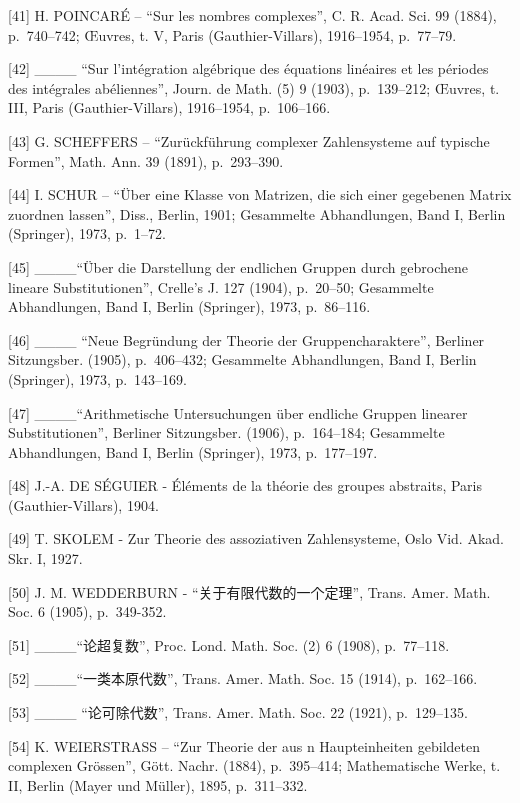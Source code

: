 {[}41{]} H. POINCARÉ -- ``Sur les nombres complexes'', C. R. Acad. Sci. 99 (1884), p.~740--742; Œuvres, t. V, Paris (Gauthier-Villars), 1916--1954, p.~77--79.

{[}42{]} \_\_\_\_ ``Sur l'intégration algébrique des équations linéaires et les périodes des intégrales abéliennes'', Journ. de Math. (5) 9 (1903), p.~139--212; Œuvres, t. III, Paris (Gauthier-Villars), 1916--1954, p.~106--166.

{[}43{]} G. SCHEFFERS -- ``Zurückführung complexer Zahlensysteme auf typische Formen'', Math. Ann. 39 (1891), p.~293--390.

{[}44{]} I. SCHUR -- ``Über eine Klasse von Matrizen, die sich einer gegebenen Matrix zuordnen lassen'', Diss., Berlin, 1901; Gesammelte Abhandlungen, Band I, Berlin (Springer), 1973, p.~1--72.

{[}45{]} \_\_\_\_``Über die Darstellung der endlichen Gruppen durch gebrochene lineare Substitutionen'', Crelle's J. 127 (1904), p.~20--50; Gesammelte Abhandlungen, Band I, Berlin (Springer), 1973, p.~86--116.

{[}46{]} \_\_\_\_ ``Neue Begründung der Theorie der Gruppencharaktere'', Berliner Sitzungsber. (1905), p.~406--432; Gesammelte Abhandlungen, Band I, Berlin (Springer), 1973, p.~143--169.

{[}47{]} \_\_\_\_``Arithmetische Untersuchungen über endliche Gruppen linearer Substitutionen'', Berliner Sitzungsber. (1906), p.~164--184; Gesammelte Abhandlungen, Band I, Berlin (Springer), 1973, p.~177--197.

{[}48{]} J.-A. DE SÉGUIER - Éléments de la théorie des groupes abstraits, Paris (Gauthier-Villars), 1904.

{[}49{]} T. SKOLEM - Zur Theorie des assoziativen Zahlensysteme, Oslo Vid. Akad. Skr. I, 1927.

{[}50{]} J. M. WEDDERBURN - ``关于有限代数的一个定理'', Trans. Amer. Math. Soc. 6 (1905), p.~349-352.

{[}51{]} \_\_\_\_``论超复数'', Proc. Lond. Math. Soc. (2) 6 (1908), p.~77--118.

{[}52{]} \_\_\_\_``一类本原代数'', Trans. Amer. Math. Soc. 15 (1914), p.~162--166.

{[}53{]} \_\_\_\_ ``论可除代数'', Trans. Amer. Math. Soc. 22 (1921), p.~129--135.

{[}54{]} K. WEIERSTRASS -- ``Zur Theorie der aus n Haupteinheiten gebildeten complexen Grössen'', Gött. Nachr. (1884), p.~395--414; Mathematische Werke, t. II, Berlin (Mayer und Müller), 1895, p.~311--332.


